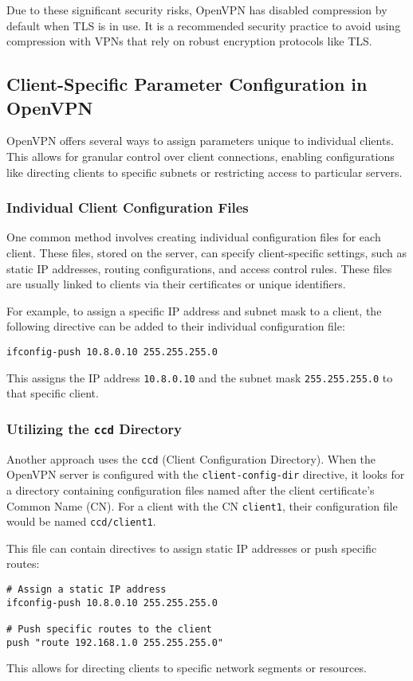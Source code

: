 Due to these significant security risks, OpenVPN has disabled compression by default when TLS is in use. It is a recommended security practice to avoid using compression with VPNs that rely on robust encryption protocols like TLS.

\subsection{Client-Specific Parameter Configuration in OpenVPN}

OpenVPN offers several ways to assign parameters unique to individual clients. This allows for granular control over client connections, enabling configurations like directing clients to specific subnets or restricting access to particular servers.

\subsubsection{Individual Client Configuration Files}

One common method involves creating individual configuration files for each client. These files, stored on the server, can specify client-specific settings, such as static IP addresses, routing configurations, and access control rules. These files are usually linked to clients via their certificates or unique identifiers.

For example, to assign a specific IP address and subnet mask to a client, the following directive can be added to their individual configuration file:
\begin{verbatim}
ifconfig-push 10.8.0.10 255.255.255.0
\end{verbatim}
This assigns the IP address \texttt{10.8.0.10} and the subnet mask \texttt{255.255.255.0} to that specific client.

\subsubsection{Utilizing the \texttt{ccd} Directory}

Another approach uses the \texttt{ccd} (Client Configuration Directory). When the OpenVPN server is configured with the \texttt{client-config-dir} directive, it looks for a directory containing configuration files named after the client certificate's Common Name (CN). For a client with the CN \texttt{client1}, their configuration file would be named \texttt{ccd/client1}.

This file can contain directives to assign static IP addresses or push specific routes:
\begin{verbatim}
# Assign a static IP address
ifconfig-push 10.8.0.10 255.255.255.0

# Push specific routes to the client
push "route 192.168.1.0 255.255.255.0"
\end{verbatim}
This allows for directing clients to specific network segments or resources.

